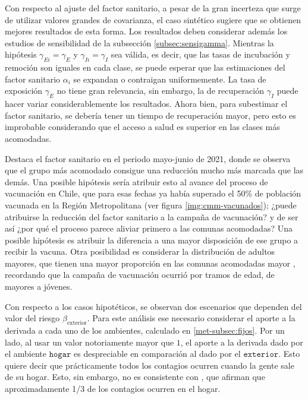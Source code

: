 Con respecto al ajuste del factor sanitario, a pesar de la gran incerteza que surge de utilizar valores grandes de covarianza, el caso sintético sugiere que se obtienen mejores resultados de esta forma. Los resultados deben considerar además los estudios de sensibilidad de la subsección \ref{subsec:sensigamma}. Mientras la hipótesis \(\gamma_{Ei} = \gamma_E\) y \(\gamma_{Ii} = \gamma_I\) sea válida, es decir, que las tasas de incubación y remoción son iguales en cada clase, se puede esperar que las estimaciones del factor sanitario \(\alpha_i\) se expandan o contraigan uniformemente. La tasa de exposición \(\gamma_E\) no tiene gran relevancia, sin embargo, la de recuperación \(\gamma_I\) puede hacer variar considerablemente los resultados. Ahora bien, para subestimar el factor sanitario, se debería tener un tiempo de recuperación mayor, pero esto es improbable considerando que el acceso a salud es superior en las clases más acomodadas.

Destaca el factor sanitario en el periodo mayo-junio de 2021, donde se observa que el grupo más acomodado consigue una reducción mucho más marcada que las demás. Una posible hipótesis sería atribuir esto al avance del proceso de vacunación en Chile, que para esas fechas ya había superado el 50\% de población vacunada en la Región Metropolitana (ver figura \ref{img:cmm-vacunados}); ¿puede atribuirse la reducción del factor sanitario a la campaña de vacunación? y de ser así ¿por qué el proceso parece aliviar primero a las comunas acomodadas? Una posible hipótesis es atribuir la diferencia a una mayor disposición de ese grupo a recibir la vacuna. Otra posibilidad es considerar la distribución de adultos mayores, que tienen una mayor proporción en las comunas acomodadas mayor \cite{LaTercera}, recordando que la campaña de vacunación ocurrió por tramos de edad, de mayores a jóvenes.

Con respecto a los casos hipotéticos, se observan dos escenarios que dependen del valor del riesgo \(\beta_{\text{exterior}}\). Para este análisis ese necesario considerar el aporte a la derivada a cada uno de los ambientes, calculado en \ref{met-subsec:fijos}. Por un lado, al usar un valor notoriamente mayor que \(1\), el aporte a la derivada dado por el ambiente \(\texttt{hogar}\) es despreciable en comparación al dado por el \(\texttt{exterior}\). Esto quiere decir que prácticamente todos los contagios ocurren cuando la gente sale de su hogar. Esto, sin embargo, no es consistente con \cite{Ferguson2020}\cite{Mossong2008}, que afirman que aproximadamente 1/3 de los contagios ocurren en el hogar.

